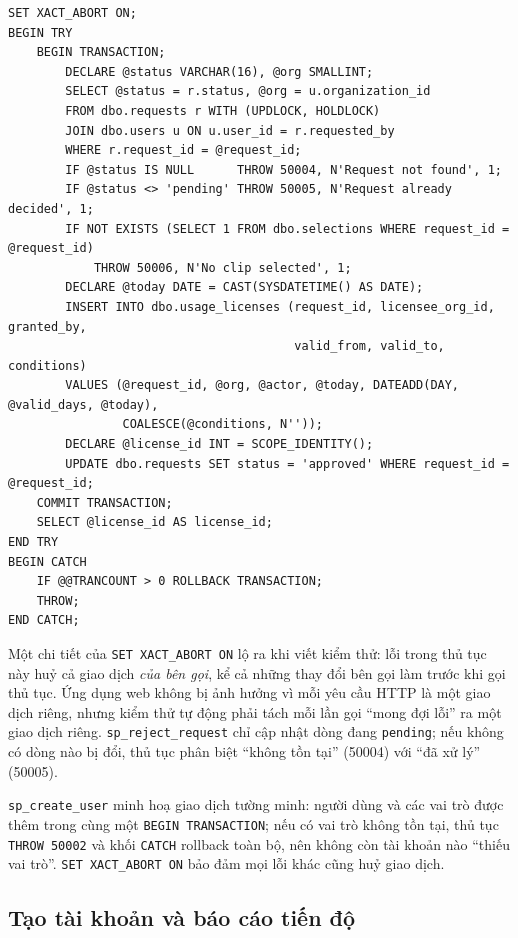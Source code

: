 \begin{lstlisting}[caption={Giao dịch trong sp\_grant\_license (rút gọn)}, label={lst:grant_license}]
SET XACT_ABORT ON;
BEGIN TRY
    BEGIN TRANSACTION;
        DECLARE @status VARCHAR(16), @org SMALLINT;
        SELECT @status = r.status, @org = u.organization_id
        FROM dbo.requests r WITH (UPDLOCK, HOLDLOCK)
        JOIN dbo.users u ON u.user_id = r.requested_by
        WHERE r.request_id = @request_id;
        IF @status IS NULL      THROW 50004, N'Request not found', 1;
        IF @status <> 'pending' THROW 50005, N'Request already decided', 1;
        IF NOT EXISTS (SELECT 1 FROM dbo.selections WHERE request_id = @request_id)
            THROW 50006, N'No clip selected', 1;
        DECLARE @today DATE = CAST(SYSDATETIME() AS DATE);
        INSERT INTO dbo.usage_licenses (request_id, licensee_org_id, granted_by,
                                        valid_from, valid_to, conditions)
        VALUES (@request_id, @org, @actor, @today, DATEADD(DAY, @valid_days, @today),
                COALESCE(@conditions, N''));
        DECLARE @license_id INT = SCOPE_IDENTITY();
        UPDATE dbo.requests SET status = 'approved' WHERE request_id = @request_id;
    COMMIT TRANSACTION;
    SELECT @license_id AS license_id;
END TRY
BEGIN CATCH
    IF @@TRANCOUNT > 0 ROLLBACK TRANSACTION;
    THROW;
END CATCH;
\end{lstlisting}

Một chi tiết của \texttt{SET XACT\_ABORT ON} lộ ra khi viết kiểm thử: lỗi trong thủ tục này
huỷ cả giao dịch \textit{của bên gọi}, kể cả những thay đổi bên gọi làm trước khi gọi thủ
tục. Ứng dụng web không bị ảnh hưởng vì mỗi yêu cầu HTTP là một giao dịch riêng, nhưng kiểm
thử tự động phải tách mỗi lần gọi ``mong đợi lỗi'' ra một giao dịch riêng.
\texttt{sp\_reject\_request} chỉ cập nhật dòng đang \texttt{pending}; nếu không có dòng nào
bị đổi, thủ tục phân biệt ``không tồn tại'' (50004) với ``đã xử lý'' (50005).

\texttt{sp\_create\_user} minh hoạ giao dịch tường minh: người dùng và các vai trò được
thêm trong cùng một \texttt{BEGIN TRANSACTION}; nếu có vai trò không tồn tại, thủ tục
\texttt{THROW 50002} và khối \texttt{CATCH} rollback toàn bộ, nên không còn tài khoản nào
``thiếu vai trò''. \texttt{SET XACT\_ABORT ON} bảo đảm mọi lỗi khác cũng huỷ giao dịch.

\subsection{Tạo tài khoản và báo cáo tiến độ}


